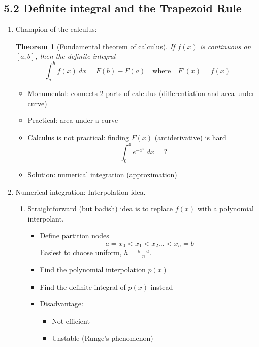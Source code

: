 \documentclass{article}
\newtheorem{thm}{Theorem}[section]
\theoremstyle{remark}
\begin{document}
\subsection{5.2 Definite integral and the Trapezoid Rule}

\begin{enumerate}
\item Champion of the calculus:
\begin{thm}[Fundamental theorem of calculus]
If $f(x)$ is continuous on $[a,b]$, then the definite integral
$$
\int_a^b f(x)~dx = F(b)-F(a)\quad\text{where}\quad F'(x) = f(x)
$$
\end{thm}
\begin{itemize}
\item Monumental: connects 2 parts of calculus (differentiation and area under curve)
\item Practical: area under a curve
\item Calculus is not practical: finding $F(x)$ (antiderivative) is hard
$$
\int_0^4 e^{-x^2}~dx = ?
$$
\item {\color{red}Solution: numerical integration (approximation)}
\end{itemize}

\item Numerical integration: Interpolation idea.
\begin{enumerate}

\item Straightforward (but badish) idea is to replace $f(x)$ with a polynomial interpolant.
\begin{itemize}
\item Define partition nodes
$$
a = x_0<x_1<x_2\dots<x_n = b
$$
Easiest to choose uniform, $h = \frac{b-a}{n}$.
\item Find the polynomial interpolation $p(x)$
\item Find the definite integral of $p(x)$ instead
\item Disadvantage: 
\begin{itemize}
\item Not efficient
\item Unstable (Runge's phenomenon)
\end{itemize}
\end{itemize}


\end{enumerate}
\end{enumerate}
\end{document}
